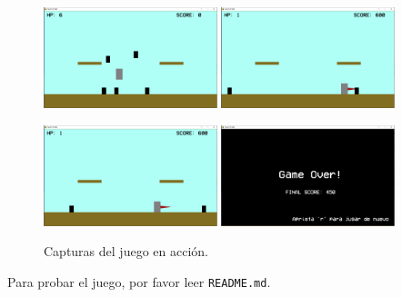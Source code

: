 \documentclass[letterpaper,11pt]{article} %
\begin{document}
	\begin{figure}[H]
		\centering
		\includegraphics[width=0.45\textwidth]{images/screencap_09}
		\hfill
		\includegraphics[width=0.45\textwidth]{images/screencap_10}
	\end{figure}

	\begin{figure}[H]
		\centering
		\includegraphics[width=0.45\textwidth]{images/screencap_11}
		\hfill
		\includegraphics[width=0.45\textwidth]{images/screencap_12}
		\caption{Capturas del juego en acción.}
	\end{figure}

	Para probar el juego, por favor leer \verb!README.md!.

\end{document}
